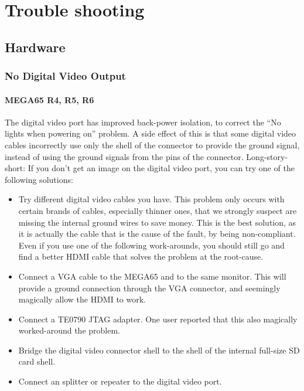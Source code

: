\lstset{
    basicstyle=\small\ttfamily,
    columns=flexible,
    breaklines=true
}

\chapter{Trouble shooting}

\section{Hardware}
    \subsection{No Digital Video Output}

    \subsubsection{MEGA65 R4, R5, R6}
    The digital video port has improved back-power isolation, to correct the ``No lights when powering on'' problem.  A side effect of this is that some digital video cables incorrectly use only the shell of the connector to provide the ground signal, instead of using the ground signals from the pins of the connector.  Long-story-short: If you don't get an image on the digital video port, you can try one of the following solutions:
    \begin{itemize}
    \item Try different digital video cables you have.  This problem only occurs with certain brands of cables, especially thinner ones, that we strongly suspect are missing the internal ground wires to save money. This is the best solution, as it is actually the cable that is the cause of the fault, by being non-compliant. Even if you use one of the following work-arounds, you should still go and find a better HDMI cable that solves the problem at the root-cause.
    \item Connect a VGA cable to the MEGA65 and to the same monitor. This will provide a ground connection through the VGA connector, and seemingly magically allow the HDMI to work.
    \item Connect a TE0790 JTAG adapter. One user reported that this also magically worked-around the problem.
    \item Bridge the digital video connector shell to the shell of the internal full-size SD card shell.
    \item Connect an splitter or repeater to the digital video port.
    \end{itemize}

